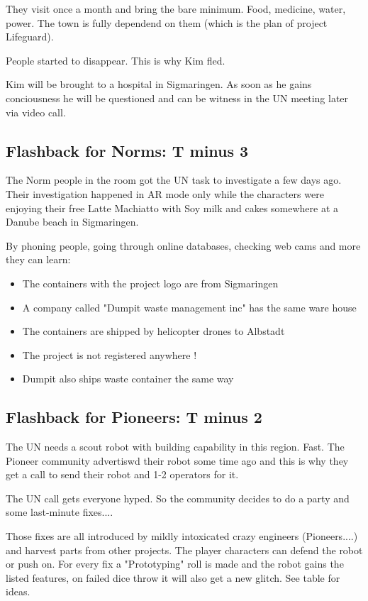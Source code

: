 They visit once a month and bring the bare minimum. Food, medicine, water, power. The town is fully dependend on them (which is the plan of project Lifeguard).

People started to disappear. This is why Kim fled.

Kim will be brought to a hospital in Sigmaringen. As soon as he gains conciousness he will be questioned and can be witness in the UN meeting later via video call.

\subsection{Flashback for Norms: T minus 3}

The Norm people in the room got the UN task to investigate a few days ago. Their investigation happened in AR mode only while the characters were enjoying their free Latte Machiatto with Soy milk and cakes somewhere at a Danube beach in Sigmaringen.

By phoning people, going through online databases, checking web cams and more they can learn:

\begin{itemize}
    \item The containers with the project logo are from Sigmaringen
    \item A company called "Dumpit waste management inc" has the same ware house
    \item The containers are shipped by helicopter drones to Albstadt
    \item The project is not registered anywhere !
    \item Dumpit also ships waste container the same way
\end{itemize}

\subsection{Flashback for Pioneers: T minus 2}

The UN needs a scout robot with building capability in this region. Fast. The Pioneer community advertiswd their robot some time ago and this is why they get a call to send their robot and 1-2 operators for it.

The UN call gets everyone hyped. So the community decides to do a party and some last-minute fixes....

Those fixes are all introduced by mildly intoxicated crazy engineers (Pioneers....) and harvest parts from other projects. The player characters can defend the robot or push on. For every fix a "Prototyping" roll is made and the robot gains the listed features, on failed dice throw it will also get a new glitch. See table for ideas.

